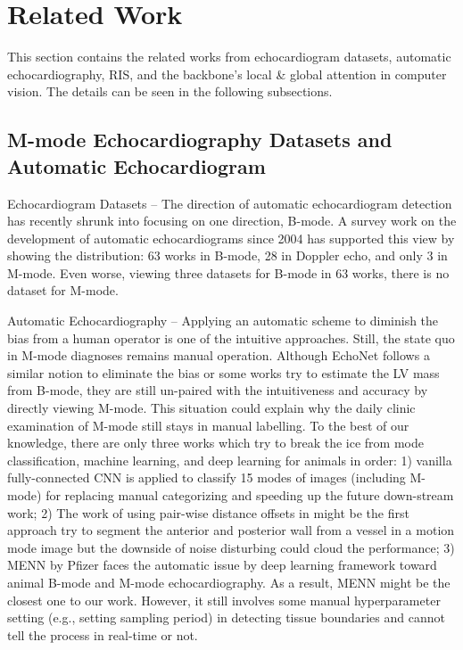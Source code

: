 \documentclass{article}
\begin{document}
\section{Related Work}
\label{sec2}
This section contains the related works from echocardiogram datasets, automatic echocardiography, RIS, and the backbone's local \& global attention in computer vision. The details can be seen in the following subsections.

\subsection{M-mode Echocardiography Datasets and Automatic Echocardiogram}
\label{sec2.1}
Echocardiogram Datasets – The direction \cite{zamzmi2020harnessing} of automatic echocardiogram detection has recently shrunk into focusing on one direction, B-mode. A survey work \cite{zamzmi2020harnessing} on the development of automatic echocardiograms since 2004 has supported this view by showing the distribution: 63 works in B-mode, 28 in Doppler echo, and only 3 in M-mode. Even worse, viewing three datasets for B-mode in 63 works, there is no dataset for M-mode. 

Automatic Echocardiography – Applying an automatic scheme to diminish the bias from a human operator is one of the intuitive approaches. Still, the state quo in M-mode diagnoses remains manual operation. Although EchoNet \cite{ghorbani2020deep}\cite{ouyang2020video} follows a similar notion to eliminate the bias or some works \cite{painchaud2022echocardiography}\cite{zamzmi2022real} try to estimate the LV mass from B-mode, they are still un-paired with the intuitiveness and accuracy by directly viewing M-mode. This situation could explain why the daily clinic examination of M-mode still stays in manual labelling. To the best of our knowledge, there are only three works which try to break the ice from mode classification, machine learning, and deep learning for animals in order: 1) vanilla fully-connected CNN \cite{madani2018fast} is applied to classify 15 modes of images (including M-mode) for replacing manual categorizing and speeding up the future down-stream work; 2) The work of using pair-wise distance offsets in \cite{fancourt2008segmentation} might be the first approach try to segment the anterior and posterior wall from a vessel in a motion mode image but the downside of noise disturbing could cloud the performance; 3) MENN \cite{duan2022fully} by Pfizer faces the automatic issue by deep learning framework toward animal B-mode and M-mode echocardiography. As a result, MENN might be the closest one to our work. However, it still involves some manual hyperparameter setting (e.g., setting sampling period) in detecting tissue boundaries and cannot tell the process in real-time or not. 
\end{document}
